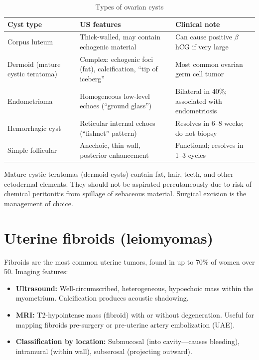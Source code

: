 \begin{table}[h]
\centering
\caption{Types of ovarian cysts}
\label{tab:ovarian_cysts}
\begin{tabular}{@{}p{}p{}p{}@{}}
\hline
\textbf{Cyst type} & \textbf{US features} & \textbf{Clinical note} \\
\hline
Corpus luteum & Thick-walled, may contain echogenic material & Can cause positive $\beta$hCG if very large \\
Dermoid (mature cystic teratoma) & Complex: echogenic foci (fat), calcification, ``tip of iceberg'' & Most common ovarian germ cell tumor \\
Endometrioma & Homogeneous low-level echoes (``ground glass'') & Bilateral in 40\%; associated with endometriosis \\
Hemorrhagic cyst & Reticular internal echoes (``fishnet'' pattern) & Resolves in 6--8 weeks; do not biopsy \\
Simple follicular & Anechoic, thin wall, posterior enhancement & Functional; resolves in 1--3 cycles \\
\hline
\end{tabular}
\end{table}

\begin{pearlbox}
Mature cystic teratomas (dermoid cysts) contain fat, hair, teeth, and other ectodermal elements. They should not be aspirated percutaneously due to risk of chemical peritonitis from spillage of sebaceous material. Surgical excision is the management of choice.
\end{pearlbox}

\section{Uterine fibroids (leiomyomas)}
Fibroids are the most common uterine tumors, found in up to 70\% of women over 50. Imaging features:
\begin{itemize}
    \item \textbf{Ultrasound:} Well-circumscribed, heterogeneous, hypoechoic mass within the myometrium. Calcification produces acoustic shadowing.
    \item \textbf{MRI:} T2-hypointense mass (fibroid) with or without degeneration. Useful for mapping fibroids pre-surgery or pre-uterine artery embolization (UAE).
    \item \textbf{Classification by location:} Submucosal (into cavity---causes bleeding), intramural (within wall), subserosal (projecting outward).
\end{itemize}

